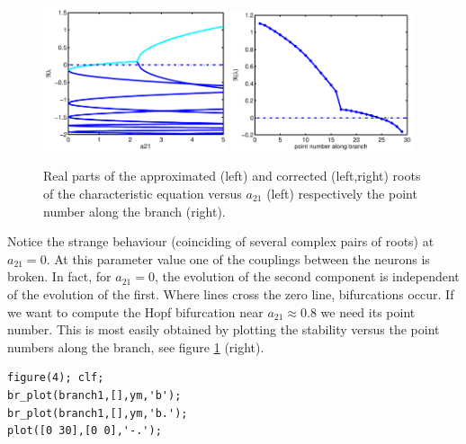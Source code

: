 \documentclass[10pt]{scrartcl}
\begin{document}
\begin{figure}[htbp]
  \begin{center}
    \includegraphics[width=0.48\textwidth]{fig/demo1fig03}%
    \includegraphics[width=0.48\textwidth]{fig/demo1fig04}
  \end{center}
  \caption{\label{ride3+4_pic}Real parts of
    the approximated (left) and corrected (left,right)
    roots of the characteristic equation
    versus $a_{21}$ (left) respectively the point number along the branch
    (right). } 
\end{figure}
Notice the strange behaviour (coinciding of several complex pairs
of roots) at $a_{21}=0$. At this parameter value
one of the couplings between the neurons is broken.
In fact, for $a_{21}=0$, the evolution of the second component is independent of
the evolution of the first. 
Where lines cross the zero line, bifurcations occur. If we want to 
compute the Hopf bifurcation near $a_{21}\approx0.8$ we need its point
number. This is most easily obtained by plotting the stability versus
the point numbers along the branch, see figure \ref{ride3+4_pic} (right).
\begin{lstlisting}
figure(4); clf;
br_plot(branch1,[],ym,'b');
br_plot(branch1,[],ym,'b.');
plot([0 30],[0 0],'-.');
\end{lstlisting}
\end{document}
